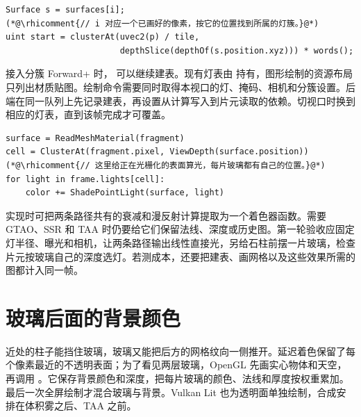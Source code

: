 \begin{lstlisting}
Surface s = surfaces[i];
(*@\rhicomment{// i 对应一个已画好的像素，按它的位置找到所属的灯簇。}@*)
uint start = clusterAt(uvec2(p) / tile,
                       depthSlice(depthOf(s.position.xyz))) * words();
\end{lstlisting}

接入分簇 Forward+ 时， 可以继续建表。现有灯表由  持有，图形绘制的资源布局只列出材质贴图。绘制命令需要同时取得本视口的灯、掩码、相机和分簇设置。后端在同一队列上先记录建表，再设置从计算写入到片元读取的依赖。切视口时换到相应的灯表，直到该帧完成才可覆盖。

\begin{lstlisting}
surface = ReadMeshMaterial(fragment)
cell = ClusterAt(fragment.pixel, ViewDepth(surface.position))
(*@\rhicomment{// 这里给正在光栅化的表面算光，每片玻璃都有自己的位置。}@*)
for light in frame.lights[cell]:
    color += ShadePointLight(surface, light)
\end{lstlisting}

实现时可把两条路径共有的衰减和漫反射计算提取为一个着色器函数。需要 GTAO、SSR 和 TAA 时仍要给它们保留法线、深度或历史图。第一轮验收应固定灯半径、曝光和相机，让两条路径输出线性直接光，另给石柱前摆一片玻璃，检查片元按玻璃自己的深度选灯。若测成本，还要把建表、画网格以及这些效果所需的图都计入同一帧。


\clearpage
\section{玻璃后面的背景颜色}

近处的柱子能挡住玻璃，玻璃又能把后方的网格纹向一侧推开。延迟着色保留了每个像素最近的不透明表面；为了看见两层玻璃，OpenGL 先画实心物体和天空，再调用 。它保存背景颜色和深度，把每片玻璃的颜色、法线和厚度按权重累加。最后一次全屏绘制才混合玻璃与背景。Vulkan Lit 也为透明面单独绘制，合成安排在体积雾之后、TAA 之前。

